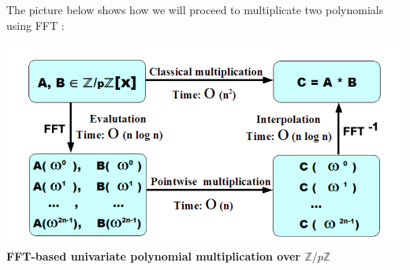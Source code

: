 The picture below shows how we will proceed to multiplicate two polynomials using FFT : \\

\begin{center}
\includegraphics[scale=0.5]{FFT.png}
\textbf{FFT-based univariate polynomial multiplication over $\mathbb{Z}/p\mathbb{Z}$}
\end{center}



